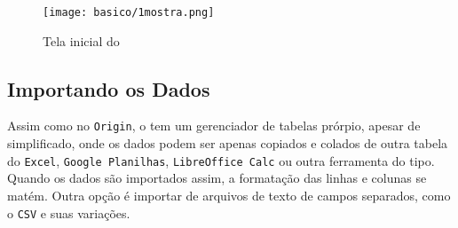 \begin{figure}[H]
    \centering
    \texttt{[image: basico/1mostra.png]}

    \caption{Tela inicial do \software}
    \label{fig:basico:mostragem}
\end{figure}








\subsection{Importando os Dados} \label{sec:basico:import}

    Assim como no \texttt{Origin}, o \software tem um gerenciador de tabelas prórpio, apesar de simplificado, onde os dados podem ser apenas copiados e colados de outra tabela do \texttt{Excel}, \texttt{Google Planilhas}, \texttt{LibreOffice Calc} ou outra ferramenta do tipo. Quando os dados são importados assim, a formatação das linhas e colunas se matém. Outra opção é importar de arquivos de texto de campos separados, como o \texttt{CSV} e suas variações.

